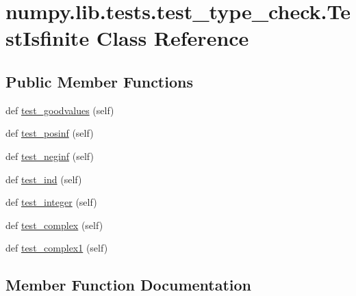 \hypertarget{classnumpy_1_1lib_1_1tests_1_1test__type__check_1_1TestIsfinite}{}\section{numpy.\+lib.\+tests.\+test\+\_\+type\+\_\+check.\+Test\+Isfinite Class Reference}
\label{classnumpy_1_1lib_1_1tests_1_1test__type__check_1_1TestIsfinite}
\subsection*{Public Member Functions}
\begin{DoxyCompactItemize}
\item 
def \hyperlink{classnumpy_1_1lib_1_1tests_1_1test__type__check_1_1TestIsfinite_ae1c2d083f5ef367b3522a3a143ec3906}{test\+\_\+goodvalues} (self)
\item 
def \hyperlink{classnumpy_1_1lib_1_1tests_1_1test__type__check_1_1TestIsfinite_ade4e63c4f51056991ea46d2ec01383cc}{test\+\_\+posinf} (self)
\item 
def \hyperlink{classnumpy_1_1lib_1_1tests_1_1test__type__check_1_1TestIsfinite_acdb738cffda614eb9defdbabd9c66916}{test\+\_\+neginf} (self)
\item 
def \hyperlink{classnumpy_1_1lib_1_1tests_1_1test__type__check_1_1TestIsfinite_a9d9b41e1447af6ea2e15e6c8c1e9099a}{test\+\_\+ind} (self)
\item 
def \hyperlink{classnumpy_1_1lib_1_1tests_1_1test__type__check_1_1TestIsfinite_a28c0c6255d8c7980de83967fd59a4bec}{test\+\_\+integer} (self)
\item 
def \hyperlink{classnumpy_1_1lib_1_1tests_1_1test__type__check_1_1TestIsfinite_a0587d57daa20320cf1bf5f560d49eade}{test\+\_\+complex} (self)
\item 
def \hyperlink{classnumpy_1_1lib_1_1tests_1_1test__type__check_1_1TestIsfinite_af2a2671d859a646480c221853be082d5}{test\+\_\+complex1} (self)
\end{DoxyCompactItemize}


\subsection{Member Function Documentation}
\mbox{\label{classnumpy_1_1lib_1_1tests_1_1test__type__check_1_1TestIsfinite_a0587d57daa20320cf1bf5f560d49eade}} 
